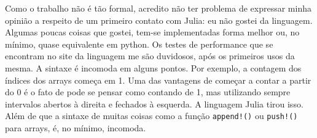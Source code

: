   \newpage

  Como o trabalho não é tão formal, acredito não ter problema de expressar minha opinião a respeito de um primeiro contato com Julia: eu não gostei da linguagem. Algumas poucas coisas que gostei, tem-se implementadas forma melhor ou, no mínimo, quase equivalente em python. Os testes de performance que se encontram no site da linguagem me são duvidosos, após os primeiros usos da mesma. A sintaxe é incomoda em alguns pontos. Por exemplo, a contagem dos índices dos arrays começa em 1. Uma das vantagens de começar a contar a partir do 0 é o fato de pode se pensar como contando de 1, mas utilizando sempre intervalos abertos à direita e fechados à esquerda. A linguagem Julia tirou isso. Além de que a sintaxe de muitas coisas como a função \texttt{append!()} ou \texttt{push!()} para arrays, é, no mínimo, incomoda.


